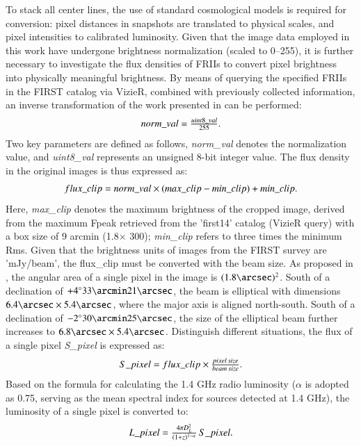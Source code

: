 \documentclass{aa}
\begin{document}
To stack all center lines, the use of standard cosmological models is required for conversion: pixel distances in snapshots are translated to physical scales, and pixel intensities to calibrated luminosity. Given that the image data employed in this work have undergone brightness normalization (scaled to 0–255), it is further necessary to investigate the flux densities of FRIIs to convert pixel brightness into physically meaningful brightness. By means of querying the specified FRIIs in the FIRST catalog via VizieR, combined with previously collected information, an inverse transformation of the work presented in \cite{griese_first_2023} can be performed:
\begin{equation}
\makebox[\linewidth]{$norm\_val = \frac{uint8\_val}{255}.$}
\end{equation}
Two key parameters are defined as follows, \textit{norm\_val} denotes the normalization value, and \textit{uint8\_val} represents an unsigned 8-bit integer value. The flux density in the original images is thus expressed as:
\begin{equation}
\makebox[\linewidth]{$flux\_clip = norm\_val \times (max\_clip - min\_clip) + min\_clip.$}
\end{equation}
Here, \textit{max\_clip} denotes the maximum brightness of the cropped image, derived from the maximum Fpeak retrieved from the 'first14' catalog (VizieR query) with a box size of 9 arcmin (1.8\arcsec  $\times$ 300); \textit{min\_clip} refers to three times the minimum Rms. Given that the brightness units of images from the FIRST survey are 'mJy/beam', the flux\_clip must be converted with the beam size. As proposed in \cite{helfand_last_2015}, the angular area of a single pixel in the image is $(1.8\arcsec)^2$. South of a declination of $+4^\circ 33\arcmin 21\arcsec$, the beam is elliptical with dimensions $6.4\arcsec \times 5.4\arcsec$, where the major axis is aligned north-south. South of a declination of $-2^\circ 30\arcmin 25\arcsec$, the size of the elliptical beam further increases to $6.8\arcsec \times 5.4\arcsec$. Distinguish different situations, the flux of a single pixel \textit{S\_pixel} is expressed as:
\begin{equation}
\makebox[\linewidth]{$S\_pixel = flux\_clip \times \frac{pixel\,size}{beam\,size}.$}
\end{equation}
Based on the formula for calculating the 1.4 GHz radio luminosity \citep{koziel-wierzbowska_identifying_2021} ($\alpha$ is adopted as 0.75, serving as the mean spectral index for sources detected at 1.4 GHz), the luminosity of a single pixel is converted to:
\begin{equation}
\makebox[\linewidth]{$L\_pixel = \frac{4\pi D_L^2}{(1+z)^{1-\alpha}}\,S\_pixel.$}
\end{equation}
\end{document}
